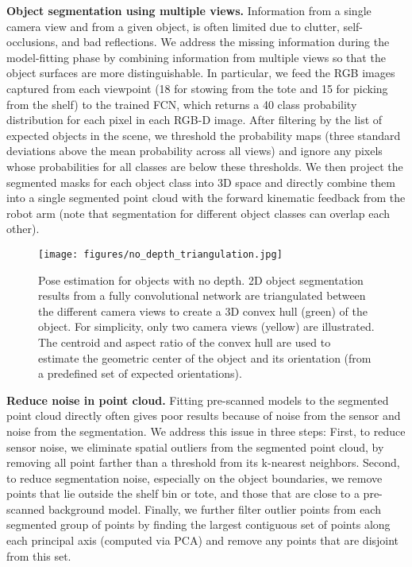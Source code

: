 \documentclass[letterpaper, 10 pt, conference]{ieeeconf}  %
\newcommand{\myparagraph}[1]{\vspace{0.1in}\noindent\textbf{#1}}
\begin{document}
\myparagraph{Object segmentation using multiple views.}
Information from a single camera view and from a given object, is often limited due to clutter, self-occlusions, and bad reflections. We address the missing information during the model-fitting phase by combining information from multiple views so that the object surfaces are more distinguishable.
In particular, we feed the RGB images captured from each viewpoint (18 for stowing from the tote and 15 for picking from the shelf) to the trained FCN, which returns a 40 class probability distribution for each pixel in each RGB-D image. 
After filtering by the list of expected objects in the scene, we threshold the probability maps (three standard deviations above the mean probability across all views) and ignore any pixels whose probabilities for all classes are below these thresholds. 
We then project the segmented masks for each object class into 3D space 
and directly combine them into a single segmented point cloud with the forward kinematic feedback from the robot arm (note that segmentation for different object classes can overlap each other). %

\begin{figure}[t]
\vspace{2mm}
\centering
  \texttt{[image: figures/no\_depth\_triangulation.jpg]}
  \caption{Pose estimation for objects with no depth. 2D object segmentation results from a fully convolutional network are triangulated between the different camera views to create a 3D convex hull (green) of the object. For simplicity, only two camera views (yellow) are illustrated. The centroid and aspect ratio of the convex hull are used to estimate the geometric center of the object and its orientation (from a predefined set of expected orientations).}
\vspace{-5mm}
\end{figure}


\myparagraph{Reduce noise in point cloud.} 
Fitting pre-scanned models to the segmented point cloud directly often gives poor results because of noise from the sensor and noise from the segmentation. We address this issue in three steps:
First, to reduce sensor noise, we eliminate spatial outliers from the segmented point cloud, by removing all point farther than a threshold from its k-nearest neighbors.
Second, to reduce segmentation noise, especially on the object boundaries, we remove points that lie outside the shelf bin or tote, and those that are close to a pre-scanned background model.
Finally, we further filter outlier points from each segmented group of points by finding the largest contiguous set of points along each principal axis (computed via PCA) and remove any points that are disjoint from this set.
\end{document}
